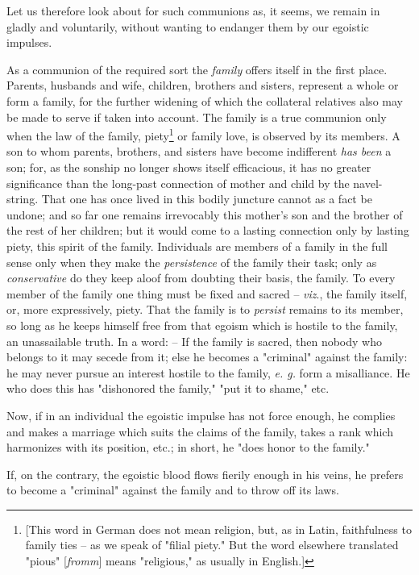 \documentclass[a4paper]{book}
\begin{document}
Let us therefore look about for such communions as, it seems, we remain in 
gladly and voluntarily, without wanting to endanger them by our egoistic 
impulses.

As a communion of the required sort the \textit{family} offers itself in the 
first place. Parents, husbands and wife, children, brothers and sisters, 
represent a whole or form a family, for the further widening of which the 
collateral relatives also may be made to serve if taken into account. The 
family is a true communion only when the law of the family, 
piety\footnote{[This word in German does not mean religion, but, as in Latin, 
faithfulness to family ties -- as we speak of "{}filial piety."{} But the word 
elsewhere translated "{}pious"{} [\textit{fromm}] means "{}religious,"{} as 
usually in English.]} or family love, is observed by its members. A son to 
whom parents, brothers, and sisters have become indifferent \textit{has been} 
a son; for, as the sonship no longer shows itself efficacious, it has no 
greater significance than the long-past connection of mother and child by the 
navel-string. That one has once lived in this bodily juncture cannot as a fact 
be undone; and so far one remains irrevocably this mother's son and the 
brother of the rest of her children; but it would come to a lasting connection 
only by lasting piety, this spirit of the family. Individuals are members of a 
family in the full sense only when they make the \textit{persistence} of the 
family their task; only as \textit{conservative} do they keep aloof from 
doubting their basis, the family. To every member of the family one thing must 
be fixed and sacred -- \textit{viz}., the family itself, or, more 
expressively, piety. That the family is to \textit{persist} remains to its 
member, so long as he keeps himself free from that egoism which is hostile to 
the family, an unassailable truth. In a word: -- If the family is sacred, then 
nobody who belongs to it may secede from it; else he becomes a "{}criminal"{} 
against the family: he may never pursue an interest hostile to the family, 
\textit{e. g.} form a misalliance. He who does this has "{}dishonored the 
family,"{} "{}put it to shame,"{} etc.

Now, if in an individual the egoistic impulse has not force enough, he 
complies and makes a marriage which suits the claims of the family, takes a 
rank which harmonizes with its position, etc.; in short, he "{}does honor to 
the family."{}

If, on the contrary, the egoistic blood flows fierily enough in his veins, he 
prefers to become a "{}criminal"{} against the family and to throw off its 
laws.
\end{document}
